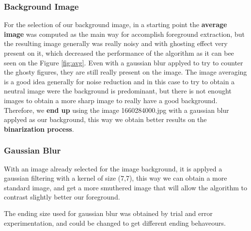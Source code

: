 \documentclass[11pt]{article}
\begin{document}
\FloatBarrier
\subsubsection*{Background Image}

For the selection of our background image, in a starting point the \textbf{average image} was computed as the main way for accomplish foreground extraction, but the resulting image generally was really noisy and with ghosting effect very present on it, which decreased the performance of the algorithm as it can bee seen on the Figure \ref{fig:avg}. Even with a gaussian blur applyed to try to counter the ghosty figures, they are still really present on the image. The image averaging is a good idea generally for noise reduction and in this case to try to obtain a neutral image were the background is predominant, but there is not enought images to obtain a more sharp image to really have a good background. Therefore, we \textbf{end up} using the image 1660284000.jpg with a gaussian blur applyed as our background, this way we obtain better results on the \textbf{binarization process}.




\subsubsection*{Gaussian Blur}
With an image already selected for the image background, it is applyed a gaussian filtering with a kernel of size (7,7), this way  we can obtain a more standard image, and get a more smuthered image that will allow the algorithm to contrast slightly better our foreground.\newline




The ending size used for gaussian blur was obtained by trial and error experimentation, and could be changed to get different ending behaveours.
\end{document}

